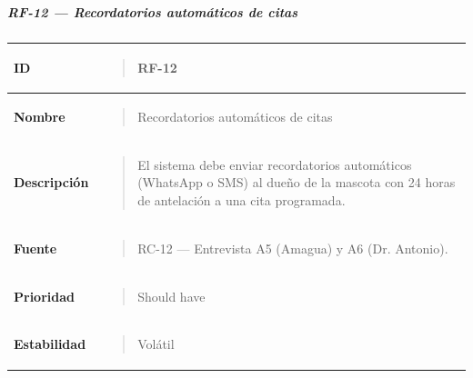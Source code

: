 \documentclass[
]{article}
\newcounter{none} %
\begin{document}
\subparagraph{RF-12 --- Recordatorios automáticos de
citas}\label{rf-12-recordatorios-automuxe1ticos-de-citas}

{\def\LTcaptype{none} %
\begin{longtable}[]{@{}
  >{\raggedright\arraybackslash}p{}
  >{\raggedright\arraybackslash}p{}@{}}
\toprule\noalign{}
\begin{minipage}[b]{\linewidth}\raggedright
\textbf{ID}
\end{minipage} & \begin{minipage}[b]{\linewidth}\raggedright
\begin{quote}
RF-12
\end{quote}
\end{minipage} \\
\midrule\noalign{}
\endhead
\bottomrule\noalign{}
\endlastfoot
\textbf{Nombre} & \begin{minipage}[t]{\linewidth}\raggedright
\begin{quote}
Recordatorios automáticos de citas
\end{quote}
\end{minipage} \\
\textbf{Descripción} & \begin{minipage}[t]{\linewidth}\raggedright
\begin{quote}
El sistema debe enviar recordatorios automáticos (WhatsApp o SMS) al
dueño de la mascota con 24 horas de antelación a una cita programada.
\end{quote}
\end{minipage} \\
\textbf{Fuente} & \begin{minipage}[t]{\linewidth}\raggedright
\begin{quote}
RC-12 --- Entrevista A5 (Amagua) y A6 (Dr. Antonio).
\end{quote}
\end{minipage} \\
\textbf{Prioridad} & \begin{minipage}[t]{\linewidth}\raggedright
\begin{quote}
Should have
\end{quote}
\end{minipage} \\
\textbf{Estabilidad} & \begin{minipage}[t]{\linewidth}\raggedright
\begin{quote}
Volátil
\end{quote}

\end{minipage}
\end{longtable}}
\end{document}
